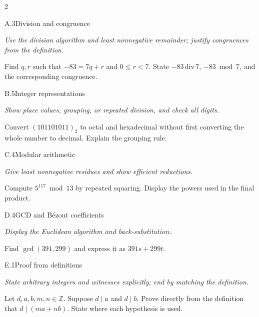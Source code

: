 \documentclass[9pt]{extarticle}
\begin{document}
\begin{multicols}{2}
\begin{CoreProblem}{A.3}{Division and congruence}
{\scriptsize\textit{Use the division algorithm and least nonnegative remainder; justify congruences from the definition.}\par}
Find $q,r$ such that $-83=7q+r$ and $0\le r<7$. State
$-83\,\mathrm{div}\,7$, $-83\bmod7$, and the corresponding congruence.
\end{CoreProblem}
\begin{CoreProblem}{B.5}{Integer representations}
{\scriptsize\textit{Show place values, grouping, or repeated division, and check all digits.}\par}
Convert $(101101011)_2$ to octal and hexadecimal without first converting the
whole number to decimal. Explain the grouping rule.
\end{CoreProblem}
\begin{CoreProblem}{C.4}{Modular arithmetic}
{\scriptsize\textit{Give least nonnegative residues and show efficient reductions.}\par}
Compute $5^{117}\bmod13$ by repeated squaring. Display the powers used in the
final product.
\end{CoreProblem}
\columnbreak
\begin{CoreProblem}{D.4}{GCD and B\'ezout coefficients}
{\scriptsize\textit{Display the Euclidean algorithm and back-substitution.}\par}
Find $\gcd(391,299)$ and express it as $391s+299t$.
\end{CoreProblem}
\begin{CoreProblem}{E.1}{Proof from definitions}
{\scriptsize\textit{State arbitrary integers and witnesses explicitly; end by matching the definition.}\par}
Let $d,a,b,m,n\in\mathbb Z$. Suppose $d\mid a$ and $d\mid b$. Prove directly
from the definition that $d\mid(ma+nb)$. State where each hypothesis is used.
\end{CoreProblem}
\end{multicols}
\CoreWorkArea
\FormBreak
{}
\end{document}

